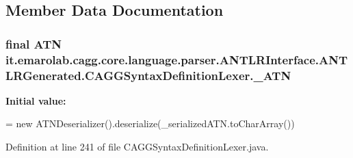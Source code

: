 \subsection{Member Data Documentation}
\hypertarget{classit_1_1emarolab_1_1cagg_1_1core_1_1language_1_1parser_1_1ANTLRInterface_1_1ANTLRGenerated_1_1CAGGSyntaxDefinitionLexer_acc1592a5dbc333e84f20363acfeb2e9c}{
\subsubsection[{\-\_\-\-A\-T\-N}]{\setlength{\rightskip}{0pt plus 5cm}final A\-T\-N it.\-emarolab.\-cagg.\-core.\-language.\-parser.\-A\-N\-T\-L\-R\-Interface.\-A\-N\-T\-L\-R\-Generated.\-C\-A\-G\-G\-Syntax\-Definition\-Lexer.\-\_\-\-A\-T\-N\hspace{0.3cm}{\ttfamily [static]}}}\label{classit_1_1emarolab_1_1cagg_1_1core_1_1language_1_1parser_1_1ANTLRInterface_1_1ANTLRGenerated_1_1CAGGSyntaxDefinitionLexer_acc1592a5dbc333e84f20363acfeb2e9c}
{\bfseries Initial value\-:}
\begin{DoxyCode}
=
        \textcolor{keyword}{new} ATNDeserializer().deserialize(\_serializedATN.toCharArray())
\end{DoxyCode}


Definition at line 241 of file C\-A\-G\-G\-Syntax\-Definition\-Lexer.\-java.

